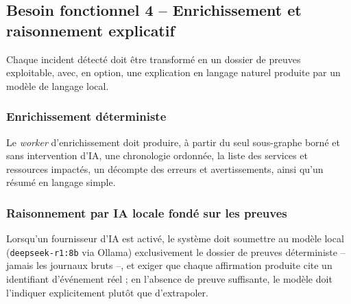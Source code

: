 \documentclass[a4paper,11pt,oneside]{report}
\begin{document}
\subsection{Besoin fonctionnel 4 -- Enrichissement et raisonnement explicatif}
Chaque incident détecté doit être transformé en un dossier de preuves exploitable, avec, en option, une explication en langage naturel produite par un modèle de langage local.
\subsubsection{Enrichissement déterministe}
Le \emph{worker} d'enrichissement doit produire, à partir du seul sous-graphe borné et sans intervention d'IA, une chronologie ordonnée, la liste des services et ressources impactés, un décompte des erreurs et avertissements, ainsi qu'un résumé en langage simple.
\subsubsection{Raisonnement par IA locale fondé sur les preuves}
Lorsqu'un fournisseur d'IA est activé, le système doit soumettre au modèle local (\texttt{deepseek-r1:8b} via Ollama) exclusivement le dossier de preuves déterministe -- jamais les journaux bruts --, et exiger que chaque affirmation produite cite un identifiant d'événement réel ; en l'absence de preuve suffisante, le modèle doit l'indiquer explicitement plutôt que d'extrapoler.
\end{document}
